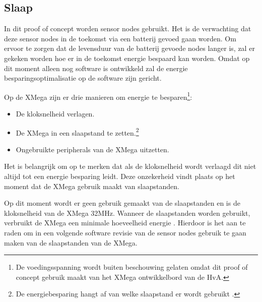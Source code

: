 \subsection{Slaap}

In dit proof of concept worden sensor nodes gebruikt. Het is de verwachting dat deze sensor nodes in de toekomst via een batterij gevoed gaan worden. Om ervoor te zorgen dat de levensduur van de batterij gevoede nodes langer is, zal er gekeken worden hoe er in de toekomst energie bespaard kan worden. Omdat op dit moment alleen nog software is ontwikkeld zal de energie besparingsoptimalisatie op de software zijn gericht. 

Op de XMega zijn er drie manieren om energie te besparen\footnote{De voedingsspanning wordt buiten beschouwing gelaten omdat dit proof of concept gebruik maakt van het XMega ontwikkelbord van de HvA.}:
\begin{itemize}
    \item De kloksnelheid verlagen.
    \item De XMega in een slaapstand te zetten.\footnote{De energiebesparing hangt af van welke slaapstand er wordt gebruikt \cite{XMegaDatasheet}.}
    \item Ongebruikte peripherals van de XMega uitzetten.
\end{itemize} 
Het is belangrijk om op te merken dat als de kloksnelheid wordt verlaagd dit niet altijd tot een energie besparing leidt. Deze onzekerheid vindt plaats op het moment dat de XMega gebruik maakt van slaapstanden. 

Op dit moment wordt er geen gebruik gemaakt van de slaapstanden en is de kloksnelheid van de XMega 32MHz. Wanneer de slaapstanden worden gebruikt, verbruikt de XMega een minimale hoeveelheid energie \cite{XMegaDatasheet}. Hierdoor is het aan te raden om in een volgende software revisie van de sensor nodes gebruik te gaan maken van de slaapstanden van de XMega. 



